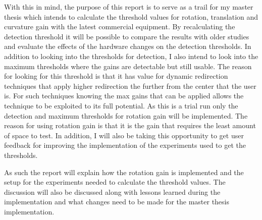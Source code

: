 
\noindent
With this in mind, the purpose of this report is to serve as a trail for my master thesis which intends to calculate the threshold values for rotation, translation and curvature gain with the latest commercial equipment. By recalculating the detection threshold it will be possible to compare the results with older studies and evaluate the effects of the hardware changes on the detection thresholds. In addition to looking into the thresholds for detection, I also intend to look into the maximum thresholds where the gains are detectable but still usable. The reason for looking for this threshold is that it has value for dynamic redirection techniques that apply higher redirection the further from the center that the user is. For such techniques knowing the max gains that can be applied allows the technique to be exploited to its full potential. As this is a trial run only the detection and maximum thresholds for rotation gain will be implemented. The reason for using rotation gain is that it is the gain that requires the least amount of space to test. In addition, I will also be taking this opportunity to get user feedback for improving the implementation of the experiments used to get the thresholds.
\bigskip


\noindent
As such the report will explain how the rotation gain is implemented and the setup for the experiments needed to calculate the threshold values. The discussion will also be discussed along with lessons learned during the implementation and what changes need to be made for the master thesis implementation.